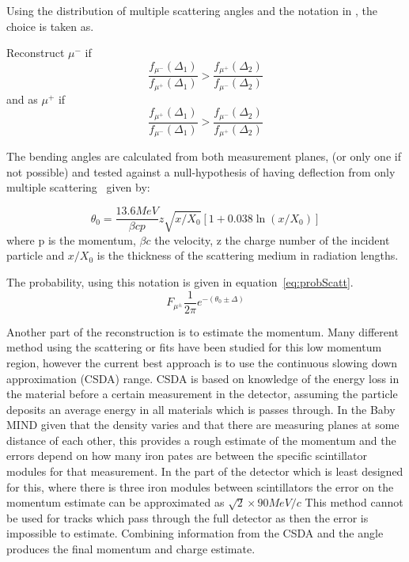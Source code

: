 Using the distribution of multiple scattering angles and the notation in , the choice is taken as. 

Reconstruct $\mu^-$ if 
\begin{equation}
\frac{f_{\mu^-}(\Delta_1)}{f_{\mu^+}(\Delta_1)} > \frac{f_{\mu^+}(\Delta_2)}{f_{\mu^-}(\Delta_2)}
\end{equation}
and as $\mu^+$ if
\begin{equation}
\frac{f_{\mu^+}(\Delta_1)}{f_{\mu^-}(\Delta_1)} > \frac{f_{\mu^-}(\Delta_2)}{f_{\mu^+}(\Delta_2)}
\end{equation}



The bending angles are calculated from both measurement planes, (or only one if not possible) and tested against a null-hypothesis of having deflection from only multiple scattering~\cite{13PDG} given by:

\begin{equation}
\theta_0 = \frac{13.6 MeV}{\beta cp} z \sqrt{x/X_0}[1+0.038\ln(x/X_0)]
\end{equation}
where p is the momentum, $\beta c$ the velocity, z the charge number of the incident particle and $x/X_0$ is the thickness of the scattering medium in radiation lengths.

The probability, using this notation is given in equation~\ref{eq:probScatt}.
\begin{equation}
F_{\mu^\pm} \frac{1}{2\pi} e ^ {-( \theta_0 \pm \Delta)}
\label{eq:probScatt}
\end{equation}

Another part of the reconstruction is to estimate the momentum. Many different method using the scattering or fits have been studied for this low momentum region, however the current best approach is to use the continuous slowing down approximation (CSDA) range.
CSDA is based on knowledge of the energy loss in the material before a certain measurement in the detector, assuming the particle deposits an average energy in all materials which is passes through. In the Baby MIND given that the density varies and that there are measuring planes at some distance of each other, this provides a rough estimate of the momentum and the errors depend on how many iron pates are between the specific scintillator modules for that measurement. In the part of the detector which is least designed for this, where there is three iron modules between scintillators the error on the momentum estimate can be approximated as $\sqrt{2} \times 90 MeV/c$ This method cannot be used for tracks which pass through the full detector as then the error is impossible to estimate. Combining information from the CSDA and the angle produces the final momentum and charge estimate.

